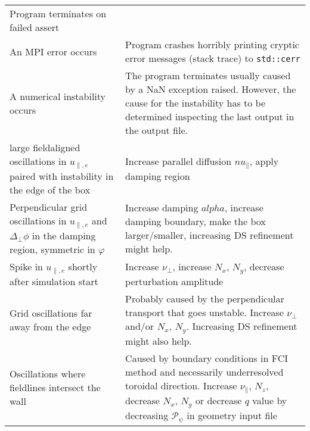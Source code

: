 \begin{longtable}{p{6cm}p{8cm}}
Program terminates on failed assert
    \\
An MPI error occurs
&
Program crashes horribly printing cryptic error messages (stack trace) to \texttt{std::cerr}
    \\
A numerical instability occurs
&
The program terminates usually caused by a NaN exception raised. However,
the cause for the instability has to be determined inspecting the
last output in the output file.
    \\
\qquad large fieldaligned oscillations in $u_{\parallel,e}$ paired with instability in the edge of the box
&
Increase parallel diffusion $nu_\parallel$, apply damping region
    \\
\qquad Perpendicular grid oscillations in $u_{\parallel,e}$ and $\Delta_\perp \phi$ in the damping region, symmetric in $\varphi$
&
Increase damping $alpha$, increase damping boundary, make the box larger/smaller, increasing DS refinement might help.
    \\
\qquad Spike in $u_{\parallel,e}$ shortly after simulation start
&
Increase $\nu_\perp$, increase $N_x$, $N_y$, decrease perturbation amplitude
    \\
\qquad Grid oscillations far away from the edge
&
Probably caused by the perpendicular transport that goes unstable. Increase $\nu_\perp$ and/or $N_x$, $N_y$. Increasing DS refinement might also help.
\\
\qquad Oscillations where fieldlines intersect the wall
&
Caused by boundary conditions in FCI method and necessarily underresolved toroidal direction.
Increase $\nu_\parallel$, $N_z$, decrease $N_x$, $N_y$ or decrease $q$ value by decreasing $\mathcal P_\psi$ in geometry input file
\\
\bottomrule
\end{longtable}





